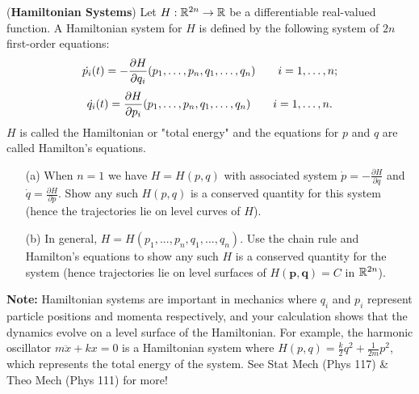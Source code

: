 \documentclass[11pt,letterpaper,boxed]{pset}
\begin{document}
\begin{problem} [Exercise 3.]
    (\textbf{Hamiltonian Systems}) Let $H:\mathbb{R}^{2n} \to \mathbb{R}$ be a differentiable real-valued function. A Hamiltonian system for $H$ is defined by the following system of $2n$ first-order equations:
    $$\dot{p_i}(t) = -{\partial H \over \partial q_i}(p_1,\ldots,p_n,q_1,\ldots,q_n) \qquad i = 1,\dots, n;$$
    $$\dot{q_i}(t) = {\partial H \over \partial p_i}(p_1,\ldots,p_n,q_1,\ldots,q_n)  \qquad i = 1,\dots, n.$$
    $H$ is called the Hamiltonian or "total energy" and the equations for $p$ and $q$ are called Hamilton's equations.
    
    \begin{enumerate}
        \item[(a)] When $n=1$ we have $H = H(p,q)$ with associated  system $\displaystyle \dot{p}  =   -\frac{\partial H}{\partial q}$ and $ \displaystyle \dot{q}  =   \frac{\partial H}{\partial p} $.  Show any such $H(p,q)$ is a conserved quantity for this system (hence the trajectories lie on level curves of $H$). 
        \item[(b)] In general,  $H = H(p_1, ..., p_n, q_1, ..., q_n)$. Use the chain rule and Hamilton's equations to show any such  $H$ is a conserved quantity for the system (hence trajectories lie on level surfaces of $H(\mathbf{p},\mathbf{q})=C$ in $\mathbb{R}^{2n}$).  
    \end{enumerate}
    
    \noindent
    \textbf{Note:}  Hamiltonian systems are important in mechanics where $q_i$ and $p_i$ represent particle positions and momenta respectively, and your calculation shows that the dynamics evolve on a level surface of the Hamiltonian.  For example, the harmonic oscillator $m \ddot{x} + k x = 0$ is a Hamiltonian system where $H(p,q)=\frac{k}{2} q^2 + \frac{1}{2m} p^2$, which represents the total energy of the system.  See Stat Mech (Phys 117) \& Theo Mech (Phys 111) for more!
\end{problem}
\newpage
\end{document}
